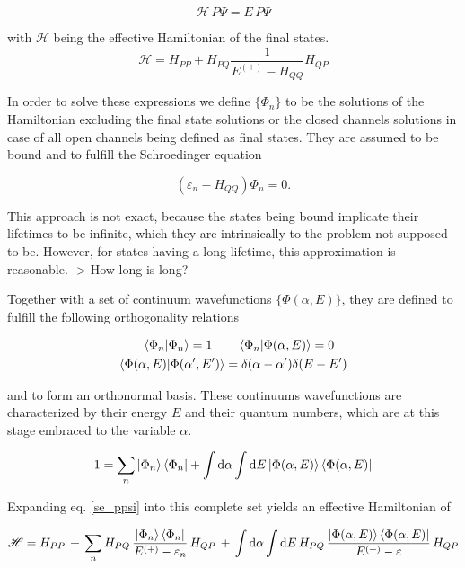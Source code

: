 \begin{equation}
  \mathscr{H} \,P \Psi = E \,P \Psi \label{se_ppsi}
\end{equation}

with $\mathscr{H}$ being the effective Hamiltonian of the final states.
\begin{equation}
  \mathscr{H} = H_{PP} + H_{PQ} \frac{1}{E^{(+)}-H_{QQ}} H_{QP}
\end{equation}

In order to solve these expressions we define $\{\Phi_n\}$ to be the solutions
of the Hamiltonian excluding the final state solutions or the closed channels
solutions in case of all open channels being defined as final states.
They are assumed to be bound and to fulfill the
Schroedinger equation

\begin{equation}
  (\varepsilon_n - H_{QQ}) \Phi_n = 0 .
\end{equation}

This approach is not exact, because the states being bound implicate
their lifetimes to be infinite, which they are intrinsically
to the problem not supposed to be. However, for states having a long lifetime,
this approximation is reasonable. -> How long is long?

Together with a set of continuum wavefunctions $\{\Phi(\alpha,E)\}$, they are
defined to fulfill the following orthogonality relations

\begin{align}
  \braket{\Phi_n|\Phi_n} = 1 \quad  & \quad \braket{\Phi_n|\Phi(\alpha,E)} = 0\\
  \braket{\Phi(\alpha,E)|\Phi(\alpha',E')} & = \delta(\alpha-\alpha') \delta(E-E')
\end{align}

and to form an orthonormal basis. These continuums wavefunctions are characterized
by their energy $E$ and their quantum numbers, which are at this stage embraced
to the variable $\alpha$.

\begin{equation}
  1 = \sum\limits_n \ket{\Phi_n}\bra{\Phi_n} + \int \mathrm{d}\alpha \int \mathrm{d}E
      \ket{\Phi(\alpha,E)}\bra{\Phi(\alpha,E)} \label{feshbach_1}
\end{equation}

Expanding eq. \ref{se_ppsi} into this complete set yields an effective Hamiltonian
of

\begin{equation}
  \mathscr{H} = H_{PP}\, + \,
  \sum\limits_n H_{PQ} \,\frac{\ket{\Phi_n}\bra{\Phi_n}}{E^{(+)}-\varepsilon_n}\, H_{QP} \,+\,
  \int \mathrm{d}\alpha \int\mathrm{d}E \,H_{PQ} \,
  \frac{\ket{\Phi(\alpha,E)}\bra{\Phi(\alpha,E)}}{E^{(+)}-\varepsilon} \, H_{QP}
\end{equation}

